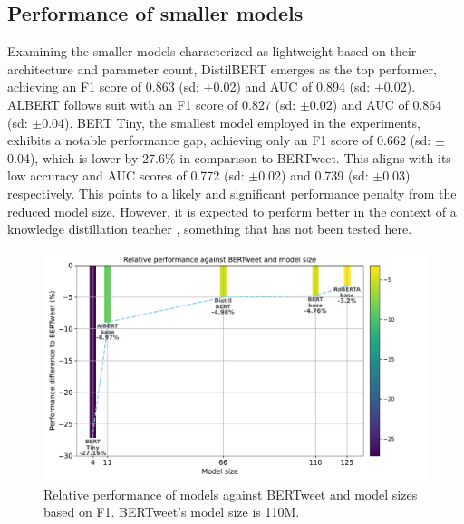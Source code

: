 \subsection{Performance of smaller models}
Examining the smaller models characterized as lightweight based on their architecture and parameter count, DistilBERT emerges as the top performer, achieving an F1 score of 0.863 (sd: $\pm$0.02) and AUC of 0.894 (sd: $\pm$0.02). ALBERT follows suit with an F1 score of 0.827 (sd: $\pm$0.02) and AUC of 0.864 (sd: $\pm$0.04). BERT Tiny, the smallest model employed in the experiments, exhibits a notable performance gap, achieving only an F1 score of 0.662 (sd: $\pm$0.04), which is lower by 27.6\% in comparison to BERTweet. This aligns with its low accuracy and AUC scores of 0.772 (sd: $\pm$0.02) and 0.739 (sd: $\pm$0.03) respectively. This points to a likely and significant performance penalty from the reduced model size. However, it is expected to perform better in the context of a knowledge distillation teacher \cite{turcWellReadStudentsLearn2019}, something that has not been tested here.\\

\begin{figure}[htb]
    \centering
    \captionsetup{font=small}
    \includegraphics[width=12cm]{figures/model_size_vs_perf.pdf}
    \vspace*{-3mm}
    \caption{Relative performance of models against BERTweet and model sizes based on F1. BERTweet's model size is 110M.}
    \label{fig: model_size_vs_perf}
\end{figure}

